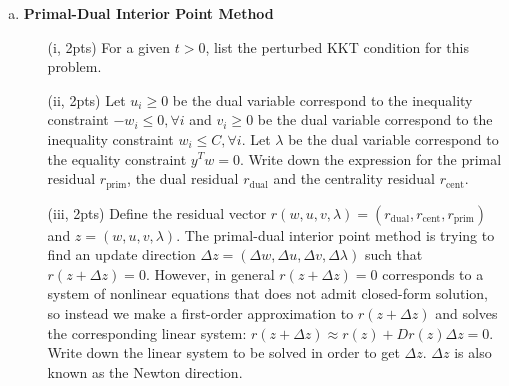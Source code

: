 \documentclass{article}
\theoremstyle{remark}
\theoremstyle{definition}
\begin{document}
\begin{enumerate}[(a)]
\item \textbf{Primal-Dual Interior Point Method}
  \begin{enumerate}[(i)]
      \item[(i, 2pts)] For a given $t > 0$, list the perturbed KKT condition for this problem.

\item[(ii, 2pts)] Let $u_i \geq 0$ be the dual variable correspond to the
  inequality constraint $-w_i \leq 0, \forall i$ and $v_i\geq 0$ be the dual variable correspond to the inequality constraint $w_i\leq C, \forall i$. Let $\lambda$ be the dual variable correspond to the equality constraint $y^Tw = 0$. Write down the expression for the primal residual $r_{\text{prim}}$, the dual residual $r_{\text{dual}}$ and the centrality residual $r_{\text{cent}}$. 

\item[(iii, 2pts)] Define the residual vector $r(w, u, v, \lambda) = (r_{\text{dual}}, r_{\text{cent}}, r_{\text{prim}})$ and $z = (w, u, v, \lambda)$. The primal-dual interior point method is trying to find an update direction $\Delta z = (\Delta w, \Delta u, \Delta v, \Delta\lambda)$ such that $r(z + \Delta z) = 0$. However, in general $r(z + \Delta z) = 0$ corresponds to a system of nonlinear equations that does not admit closed-form solution, so instead we make a first-order approximation to $r(z + \Delta z)$ and solves the corresponding linear system: $r(z + \Delta z)\approx r(z) + Dr(z)\Delta z = 0$. Write down the linear system to be solved in order to get $\Delta z$. $\Delta z$ is also known as the Newton direction.


\end{enumerate}
\end{enumerate}
\end{document}
